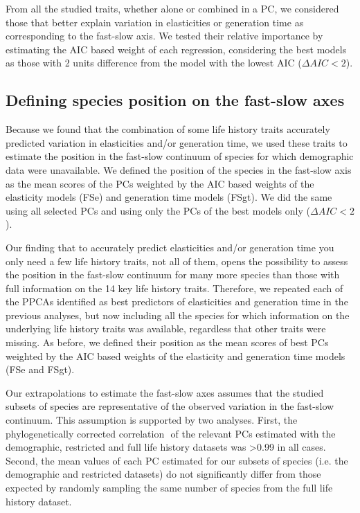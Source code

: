 From all the studied traits, whether alone or combined in a PC, we considered
those that better explain variation in elasticities or generation time as
corresponding to the fast-slow axis. We tested their relative importance by
estimating the AIC based weight of each regression, considering the best models
as those with 2 units difference from the model with the lowest AIC
($\Delta AIC < 2$).


\subsection*{Defining species position on the fast-slow axes}

Because we found that the combination of some life history traits accurately
predicted variation in elasticities and/or generation time, we used these traits
to estimate the position in the fast-slow continuum of species for which
demographic data were unavailable.
We defined the position of the species in the fast-slow axis as the mean scores
of the PCs weighted by the AIC based weights of the elasticity models (FSe) and
generation time models (FSgt). We did the same using all selected PCs and using
only the PCs of the best models only ($\Delta AIC < 2$).

Our finding that to accurately predict elasticities and/or generation time you 
only need a few life history traits, not all of them, opens the possibility to
assess the position in the fast-slow continuum for many more species than those 
with full information on the 14 key life history traits. Therefore, we repeated 
each of the PPCAs identified as best predictors of elasticities and generation 
time in the previous analyses, but now including all the species for which 
information on the underlying life history traits was available, regardless that 
other traits were missing. As before, we defined their position as the mean 
scores of best PCs weighted by the AIC based weights of the elasticity 
and generation time models (FSe and FSgt).

Our extrapolations to estimate the fast-slow axes assumes that the studied
subsets of species are representative of the observed variation in the fast-slow
continuum.
This assumption is supported by two analyses. First, the phylogenetically 
corrected correlation \citep{Revell2009a}⁠ of the relevant PCs estimated with
the demographic, restricted and full life history datasets was
\textgreater{0.99} in all cases.
Second, the mean values of each PC estimated for our subsets of species (i.e.
the demographic and restricted datasets) do not significantly differ from those
expected by randomly sampling the same number of species from the full life
history dataset.



